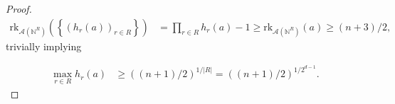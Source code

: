 \documentclass[10pt,a4paper]{amsart}
\newcommand{\A}{\mathcal{A}}
\newcommand{\N}{\mathbb{N}}
\newcommand{\rk}{\mathrm{rk}}
\begin{document}
\begin{proof}
	 \begin{align*}
	 	\rk_{\A(\N^R)} \left( \left\{ \left(h_r(a) \right)_{r\in R} \right\} \right)
	 		&= \prod_{r\in R} h_r(a) - 1 \geq  \rk_{\A(\N^R)}(a)
	 			\geq (n+3)/2,
	 \end{align*}
	 trivially implying 

	 \begin{align*}
	 		\max_{r\in R} h_r(a) &\geq \left((n+1)/2\right)^{1/|R|}
	 			= \left((n+1)/2\right)^{1/2^{d-1}}.
	 \end{align*}
\end{proof}
\end{document}
